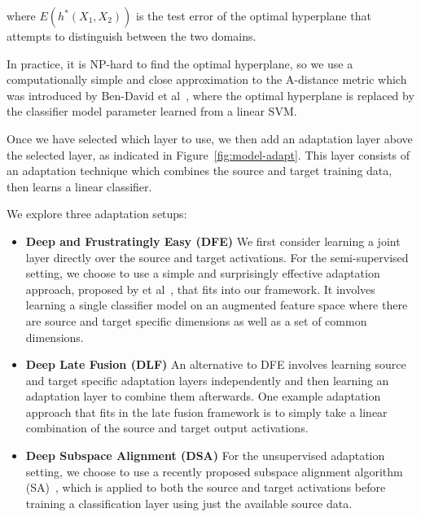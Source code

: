 where $E(h^*(X_1, X_2))$ is the test error of the optimal hyperplane that attempts to
distinguish between the two domains.

In practice, it is NP-hard to find the optimal hyperplane, so we use a computationally simple and 
close approximation to the A-distance metric which was introduced by Ben-David et al~\cite{adist-comp}, 
where the optimal hyperplane is replaced by the classifier model parameter learned from a linear SVM.

Once we have selected which layer to use, we then add an adaptation layer above
the selected layer, as indicated in Figure~\ref{fig:model-adapt}. This layer
consists of an adaptation technique which combines the source and target
training data, then learns a linear classifier.

We explore three adaptation setups:
\begin{itemize}
  \item \textbf{Deep and Frustratingly Easy (DFE)}
    We first consider learning a joint layer directly over the source and target
    activations. For the semi-supervised setting, we choose to use a simple and
    surprisingly effective adaptation approach, proposed by \daume
    et al~\cite{daume}, that fits into our framework. It involves learning a
    single classifier model on an augmented feature space where there are source
    and target specific dimensions as well as a set of common dimensions.

  \item \textbf{Deep Late Fusion (DLF)}
    An alternative to DFE involves learning source and target specific
    adaptation layers independently and then learning an adaptation layer to
    combine them afterwards. One example adaptation approach that fits in the
    late fusion framework is to simply take a linear combination of the source
    and target output activations.

  \item \textbf{Deep Subspace Alignment (DSA)}
    For the unsupervised adaptation setting, we choose to use a recently
    proposed subspace alignment algorithm (SA)~\cite{sa}, which is applied to
    both the source and target activations before training a classification
    layer using just the available source data.

\end{itemize}

